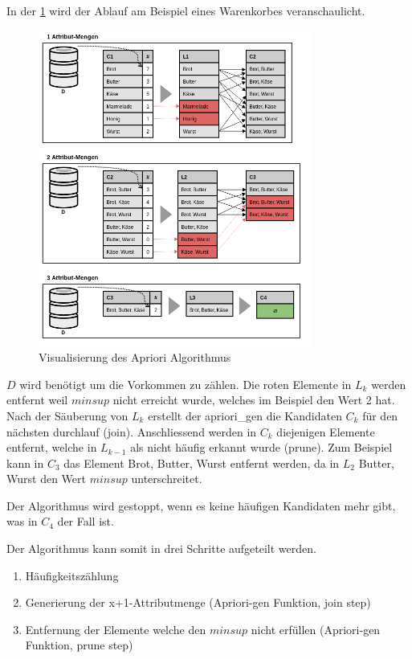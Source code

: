 In der \cref{fig:recherche:vorgehensweise:apriorialgorithmus} wird der Ablauf am Beispiel eines Warenkorbes veranschaulicht.

\begin{figure}[H]
\RawFloats
\centering
\includegraphics[width=0.8\textwidth]{images/Apriori-Algorithmus.png}
\caption{Visualisierung des Apriori Algorithmus}
\label{fig:recherche:vorgehensweise:apriorialgorithmus}
\end{figure}

$D$ wird benötigt um die Vorkommen zu zählen. Die roten Elemente in $L_k$ werden entfernt weil $minsup$ nicht erreicht wurde, welches im Beispiel den Wert 2 hat. Nach der Säuberung von $L_k$ erstellt der apriori\_gen die Kandidaten $C_k$ für den nächsten durchlauf (join). Anschliessend werden in $C_k$ diejenigen Elemente entfernt, welche in $L_{k-1}$ als nicht häufig erkannt wurde (prune). Zum Beispiel kann in $C_3$ das Element {Brot, Butter, Wurst} entfernt werden, da in $L_2$ {Butter, Wurst} den Wert $minsup$ unterschreitet.

Der Algorithmus wird gestoppt, wenn es keine häufigen Kandidaten mehr gibt, was in $C_4$ der Fall ist.

Der Algorithmus kann somit in drei Schritte aufgeteilt werden.
\begin{enumerate}
\item Häufigkeitszählung
\item Generierung der x+1-Attributmenge (Apriori-gen Funktion, join step)
\item Entfernung der Elemente welche den $minsup$ nicht erfüllen (Apriori-gen Funktion, prune step)
\end{enumerate}

